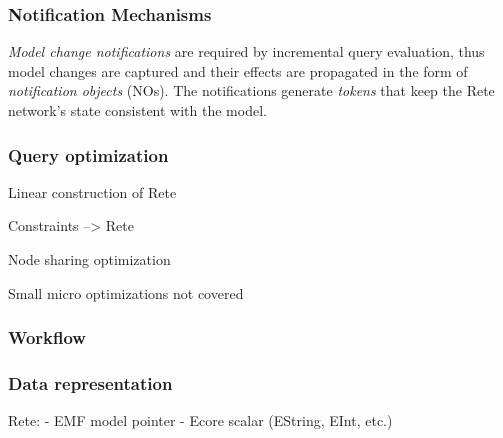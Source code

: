 


\subsubsection{Notification Mechanisms}
\label{notifications}

\emph{Model change notifications} are required by incremental query evaluation, thus model changes are captured and their effects are propagated in the form of \emph{notification objects} (NOs). The notifications generate \emph{tokens} that keep the Rete network's state consistent with the model. 


\subsubsection{Query optimization}

Linear construction of Rete

Constraints --> Rete

Node sharing optimization

Small micro optimizations not covered

\cite{BergmannPhD}

\subsubsection{Workflow}


\subsubsection{Data representation}

Rete:
- EMF model pointer
- Ecore scalar (EString, EInt, etc.)
